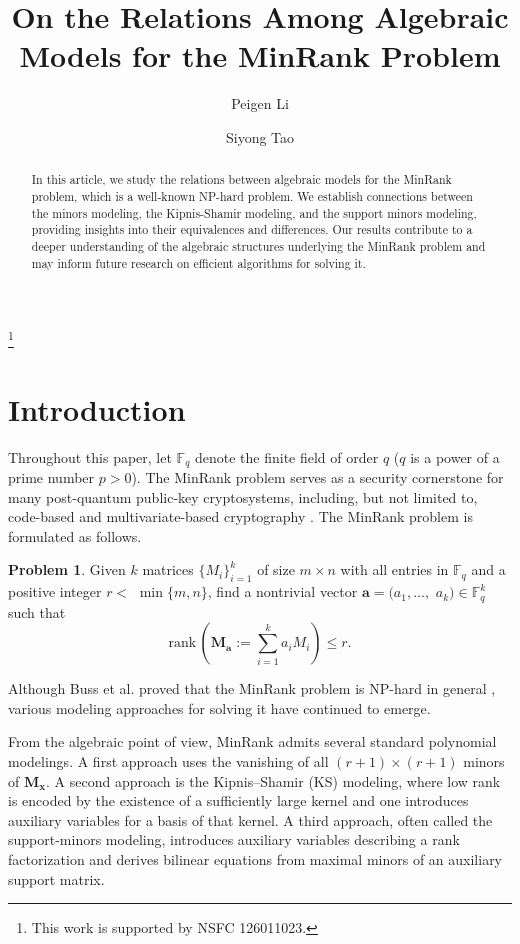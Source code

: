 \documentclass[a4paper, 11pt]{amsart}
\title{On the Relations Among Algebraic Models for the MinRank Problem}
\author{Peigen Li}
\author{Siyong Tao}
\newcommand{\kh}[1]{\left(#1\right)}
\newcommand{\td}[1]{\bm{#1}}
\newcommand{\tx}[1]{\text{#1}}
\newcommand{\fq}{\mathbb{F}_q}
\theoremstyle{definition}
\theoremstyle{definition}
\newtheorem*{problem}{Problem}
\begin{document}
	
	\footnote{This work is supported by NSFC 126011023.}
	\begin{abstract}
		In this article, we study the relations between algebraic models for the MinRank problem, which is a well-known NP-hard problem. We establish connections between the minors modeling, the Kipnis-Shamir modeling, and the support minors modeling, providing insights into their equivalences and differences. Our results contribute to a deeper understanding of the algebraic structures underlying the MinRank problem and may inform future research on efficient algorithms for solving it.
	\end{abstract}
	\maketitle
	\section{Introduction}
	Throughout this paper, let $\fq$ denote the finite field of order $q$ ($q$ is a power of a prime number $p>0$). The MinRank problem serves as a security cornerstone for many post-quantum public-key cryptosystems, including, but not limited to, code-based \cite{gaborit2015complexity,loidreau2017new} and multivariate-based cryptography \cite{patarin1996hidden,kipnis1999unbalanced,ding2005rainbow}. The MinRank problem is formulated as follows. 
	\begin{problem}
		Given $k$ matrices $\{M_i\}_{i=1}^k$ of size $m\times n$ with all entries in $\fq$ and a positive integer $r<$ $\min\{m,n\}$, find a nontrivial vector $\td{a}=(a_1,\dots,$ $a_k)\in\fq^k$ such that
		\begin{equation*}
			\tx{rank}\,\kh{\td{M_a}:=\sum^k_{i=1}a_iM_i}\leq r.
		\end{equation*}
	\end{problem}
	Although Buss et al. proved that the MinRank problem is NP-hard in general \cite{buss1999computational}, various modeling approaches for solving it have continued to emerge.
	
	From the algebraic point of view, MinRank admits several standard polynomial modelings. A first approach uses the vanishing of all $(r+1)\times(r+1)$ minors of $\td{M_x}$. A second approach is the Kipnis--Shamir (KS) modeling, where low rank is encoded by the existence of a sufficiently large kernel and one introduces auxiliary variables for a basis of that kernel. A third approach, often called the support-minors modeling, introduces auxiliary variables describing a rank factorization and derives bilinear equations from maximal minors of an auxiliary support matrix.
	
\end{document}
